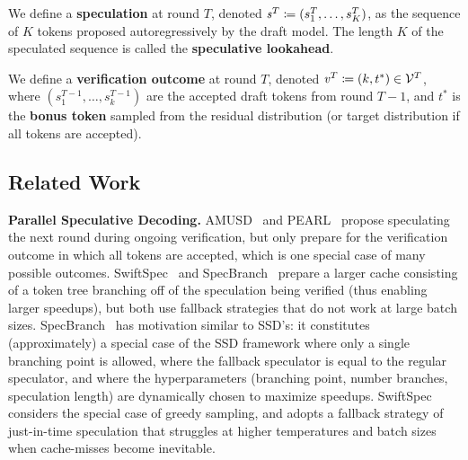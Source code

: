 \begin{definition}
We define a \textbf{speculation} at round $T$, denoted $\mathit{s}^T \coloneqq (s_1^T, \ldots, s_K^T)$, as the sequence of $K$ tokens proposed autoregressively by the draft model.
The length $K$ of the speculated sequence is called the \textbf{speculative lookahead}.
\end{definition}

\begin{definition}
We define a \textbf{verification outcome} at round $T$, denoted $\mathit{v}^T \coloneqq (k, t^*) \in \mathcal{V}^T$, where $(s_1^{T-1}, \ldots, s_k^{T-1})$ are the accepted draft tokens from round $T-1$, and $t^*$ is the \textbf{bonus token} sampled from the residual distribution (or target distribution if all tokens are accepted). 
\end{definition}

\subsection{Related Work}
\label{sec:related_work}

\textbf{Parallel Speculative Decoding.}
AMUSD~\citep{amusd} and PEARL~\citep{pearl} propose speculating the next round during ongoing verification, but only prepare for the verification outcome in which all tokens are accepted, which is one special case of many possible outcomes.
SwiftSpec~\citep{swiftspec} and SpecBranch~\citep{specbranch} prepare a larger cache consisting of a token tree branching off of the speculation being verified (thus enabling larger speedups), but both use fallback strategies that do not work at large batch sizes. SpecBranch~\citep{specbranch} has motivation similar to SSD's: it constitutes (approximately) a special case of the SSD framework where only a single branching point is allowed, where the fallback speculator is equal to the regular speculator, and where the hyperparameters (branching point, number branches, speculation length) are dynamically chosen to maximize speedups.
SwiftSpec~\citep{swiftspec} considers the special case of greedy sampling, and adopts a fallback strategy of just-in-time speculation that struggles at higher temperatures and batch sizes when cache-misses become inevitable.

